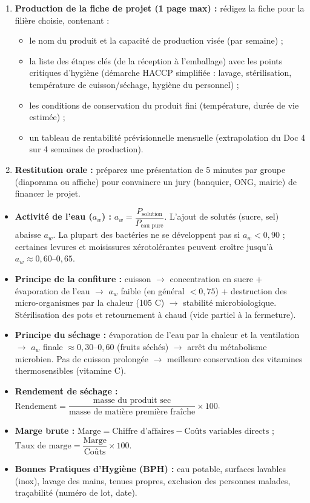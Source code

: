 \documentclass[11pt]{article}
\newcounter{popsec}
\newcounter{popsub}
\newcommand{\courssub}[1]{%
  \stepcounter{popsub}%
  \par\vspace{9pt}\noindent{\popxbold\fontsize{11.5}{13}\selectfont\color{popink}{\color{poporange}\thepopsec.\thepopsub}\hspace{6pt}#1}\par\nopagebreak\vspace{4pt}
}
\begin{document}
\begin{enumerate}
    \item \textbf{Production de la fiche de projet (1 page max) :} rédigez la fiche pour la filière choisie, contenant :
    \begin{itemize}
        \item le nom du produit et la capacité de production visée (par semaine) ;
        \item la liste des étapes clés (de la réception à l'emballage) avec les points critiques d'hygiène (démarche HACCP simplifiée : lavage, stérilisation, température de cuisson/séchage, hygiène du personnel) ;
        \item les conditions de conservation du produit fini (température, durée de vie estimée) ;
        \item un tableau de rentabilité prévisionnelle mensuelle (extrapolation du Doc 4 sur 4 semaines de production).
    \end{itemize}
    \item \textbf{Restitution orale :} préparez une présentation de 5 minutes par groupe (diaporama ou affiche) pour convaincre un jury (banquier, ONG, mairie) de financer le projet.
\end{enumerate}

\courssub{Ressources à mobiliser}
\begin{itemize}
    \item \textbf{Activité de l'eau ($a_w$) :} $a_w = \dfrac{P_{\text{solution}}}{P_{\text{eau pure}}}$. L'ajout de solutés (sucre, sel) abaisse $a_w$. La plupart des bactéries ne se développent pas si $a_w < 0,90$ ; certaines levures et moisissures xérotolérantes peuvent croître jusqu'à $a_w \approx 0,60$--$0,65$.
    \item \textbf{Principe de la confiture :} cuisson $\rightarrow$ concentration en sucre + évaporation de l'eau $\rightarrow$ $a_w$ faible (en général $< 0,75$) + destruction des micro-organismes par la chaleur (105 \textdegree C) $\rightarrow$ stabilité microbiologique. Stérilisation des pots et retournement à chaud (vide partiel à la fermeture).
    \item \textbf{Principe du séchage :} évaporation de l'eau par la chaleur et la ventilation $\rightarrow$ $a_w$ finale $\approx 0,30$--$0,60$ (fruits séchés) $\rightarrow$ arrêt du métabolisme microbien. Pas de cuisson prolongée $\rightarrow$ meilleure conservation des vitamines thermosensibles (vitamine C).
    \item \textbf{Rendement de séchage :} $\text{Rendement} = \dfrac{\text{masse du produit sec}}{\text{masse de matière première fraîche}} \times 100$.
    \item \textbf{Marge brute :} $\text{Marge} = \text{Chiffre d'affaires} - \text{Coûts variables directs}$ ; $\text{Taux de marge} = \dfrac{\text{Marge}}{\text{Coûts}} \times 100$.
    \item \textbf{Bonnes Pratiques d'Hygiène (BPH) :} eau potable, surfaces lavables (inox), lavage des mains, tenues propres, exclusion des personnes malades, traçabilité (numéro de lot, date).
\end{itemize}
\end{document}
